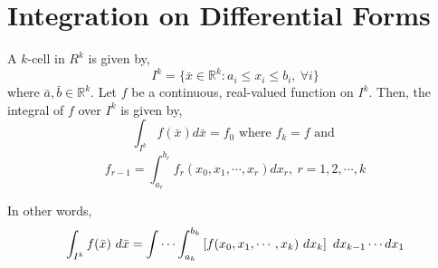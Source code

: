 \section{Integration on Differential Forms}
\begin{definition}
	A $k$-cell in $R^k$ is given by, 
	$$I^k = \{ \bar{x} \in \mathbb{R}^k : a_i \le x_i \le b_i,\ \forall i \}$$
	where $\bar{a},\bar{b} \in \mathbb{R}^k$.
	Let $f$ be a continuous, real-valued function on $I^k$.
	Then, the integral of $f$ over $I^k$ is given by,
	$$\int_{I^k}f(\bar{x}) d\bar{x} = f_0 \text{ where } f_k = f \text{ and }$$
	$$f_{r-1} = \int_{a_r}^{b_r} f_r(x_0,x_1,\cdots,x_r) dx_r,\ r = 1,2,\cdots,k$$
\begin{commentary}
	In other words,
	$$\int_{I^k} f(\bar{x})\ d\bar{x} = \idotsint_{a_k}^{b_k} \left[f(x_0,x_1,\cdots,x_k)\ dx_k\right]\ dx_{k-1}\cdots dx_1$$
\end{commentary}
\end{definition}

